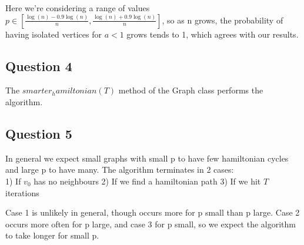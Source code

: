 \documentclass[10pt,a4paper]{report}
\begin{document}
Here we're considering a range of values $p\in[\frac{\log(n)-0.9\log(n)}{n},\frac{\log(n)+0.9\log(n)}{n} ]$, so as n grows, the probability of having isolated vertices for $a<1$ grows tends to 1, which agrees with our results.

\subsection*{Question 4}

The $smarter_hamiltonian(T)$ method of the Graph class performs the algorithm. 

\subsection*{Question 5}

In general we expect small graphs with small p to have few hamiltonian cycles and large p to have many. The algorithm terminates in 2 cases:\\

1) If $v_0$ has no neighbours
2) If we find a hamiltonian path 
3) If we hit $T$ iterations

Case 1 is unlikely in general, though occurs more for p small than p large. Case 2 occurs more often for p large, and case 3 for p small, so we expect the algorithm to take longer for small p.
\end{document}
